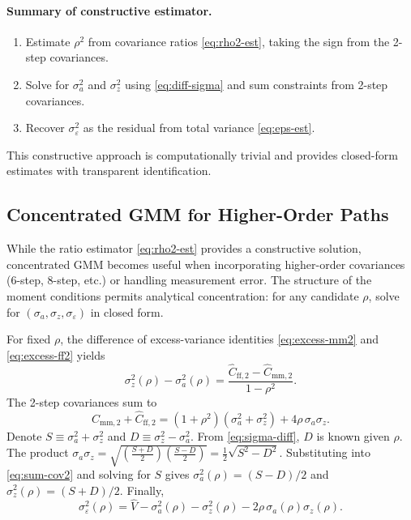 \documentclass[11pt]{article}
\begin{document}
\paragraph{Summary of constructive estimator.}
\begin{enumerate}
 \item Estimate $\rho^2$ from covariance ratios \eqref{eq:rho2-est}, taking the sign from the 2-step covariances.
 \item Solve for $\sigma_a^2$ and $\sigma_z^2$ using \eqref{eq:diff-sigma} and sum constraints from 2-step covariances.
 \item Recover $\sigma_\varepsilon^2$ as the residual from total variance \eqref{eq:eps-est}.
\end{enumerate}
This constructive approach is computationally trivial and provides closed-form estimates with transparent identification.

\subsection{Concentrated GMM for Higher-Order Paths}
\label{sec:concentrated}
While the ratio estimator \eqref{eq:rho2-est} provides a constructive solution, concentrated GMM becomes useful when incorporating higher-order covariances (6-step, 8-step, etc.) or handling measurement error. The structure of the moment conditions permits analytical concentration: for any candidate $\rho$, solve for $(\sigma_a,\sigma_z,\sigma_\varepsilon)$ in closed form.

For fixed $\rho$, the difference of excess-variance identities \eqref{eq:excess-mm2} and \eqref{eq:excess-ff2} yields
\begin{equation}
\label{eq:sigma-diff}
 \sigma_z^2(\rho) - \sigma_a^2(\rho) = \frac{\widehat C_{\text{ff},2} - \widehat C_{\text{mm},2}}{1-\rho^2}.
\end{equation}
The 2-step covariances sum to
\begin{equation}
\label{eq:sum-cov2}
 \widehat C_{\text{mm},2} + \widehat C_{\text{ff},2} = (1+\rho^2)(\sigma_a^2 + \sigma_z^2) + 4\rho\,\sigma_a\sigma_z.
\end{equation}
Denote $S \equiv \sigma_a^2 + \sigma_z^2$ and $D \equiv \sigma_z^2 - \sigma_a^2$. From \eqref{eq:sigma-diff}, $D$ is known given $\rho$. The product $\sigma_a\sigma_z = \sqrt{(\tfrac{S+D}{2})(\tfrac{S-D}{2})} = \tfrac{1}{2}\sqrt{S^2 - D^2}$. Substituting into \eqref{eq:sum-cov2} and solving for $S$ gives $\sigma_a^2(\rho) = (S-D)/2$ and $\sigma_z^2(\rho) = (S+D)/2$. Finally,
\begin{equation}
\label{eq:sigma-eps-rho}
 \sigma_\varepsilon^2(\rho) = \widehat V - \sigma_a^2(\rho) - \sigma_z^2(\rho) - 2\rho\,\sigma_a(\rho)\sigma_z(\rho).
\end{equation}
\end{document}
